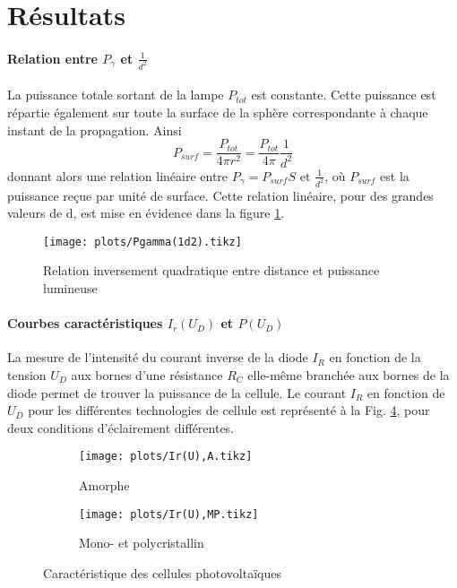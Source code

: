 \section{Résultats}

\paragraph*{Relation entre \(P_\gamma\) et \(\frac{1}{d^2}\)}
La puissance totale sortant de la lampe \(P_{tot}\) est constante. Cette puissance est répartie également sur toute la surface de la sphère correspondante à chaque instant de la propagation. Ainsi
\[P_{surf} = \frac{P_{tot}}{4 \pi r^2} = \frac{P_{tot}}{4 \pi} \frac{1}{d^2} \]
donnant alors une relation linéaire entre \(P_\gamma = P_{surf} S\) et \(\frac{1}{d^2}\), où \(P_{surf}\) est la puissance reçue par unité de surface.
Cette relation linéaire, pour des grandes valeurs de d, est mise en évidence dans la figure \ref{plot:1}.

\begin{figure}[h]
    \centering
    \texttt{[image: plots/Pgamma(1d2).tikz]}
    \caption{Relation inversement quadratique entre distance et puissance lumineuse}
    \label{plot:1}
\end{figure}

\paragraph*{Courbes caractéristiques \(I_r(U_D)\) et \(P(U_D)\)}
La mesure de l'intensité du courant inverse de la diode \(I_R\) en fonction de la tension \(U_D\) aux bornes d'une résistance \(R_C\) elle-même branchée aux bornes de la diode permet de trouver la puissance de la cellule. Le courant \(I_R\) en fonction de \(U_D\) pour les différentes technologies de cellule est représenté à la Fig. \ref{plot:2}, pour deux conditions d'éclairement différentes.

\begin{figure}[h]
    \centering
    \begin{subfigure}[c]{0.4\linewidth}
        \centering
        \texttt{[image: plots/Ir(U),A.tikz]}
        \caption{Amorphe}
        \label{plot:2a}
    \end{subfigure}
    \begin{subfigure}[c]{0.4\linewidth}
        \centering
        \texttt{[image: plots/Ir(U),MP.tikz]}
        \caption{Mono- et polycristallin}
        \label{plot:2b}
    \end{subfigure}
    \caption{Caractéristique des cellules photovoltaïques}
    \label{plot:2}
\end{figure}


